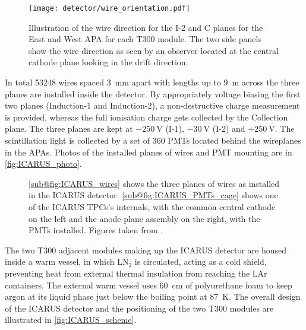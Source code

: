 \begin{figure}
    \centering
    \texttt{[image: detector/wire\_orientation.pdf]}
    \caption[T300 module Induction-2 and collection planes wire orientation]{Illustration of the wire direction for the I-2 and C planes for the East and West APA for each T300 module. The two side panels show the wire direction as seen by an observer located at the central cathode plane looking in the drift direction. }
    \label{fig:i2_c_planes_wirepitch_detail}
\end{figure}

In total \num{53248} wires spaced \SI{3}{\mm} apart with lengths up to \SI{9}{\m} across the three planes are installed inside the detector. By appropriately voltage biasing the first two planes (Induction-1 and Induction-2), a non-destructive charge measurement is provided, whereas the full ionisation charge gets collected by the Collection plane. The three planes are kept at $-\SI{250}{\volt}$ (I-1), $-\SI{30}{\volt}$ (I-2) and $+\SI{250}{\volt}$. The scintillation light is collected by a set of \num{360} PMTs located behind the wireplanes in the APAs. Photos of the installed planes of wires and PMT mounting are in \autoref{fig:ICARUS_photo}. 

\begin{figure}
    \centering
    \hspace{1em}
    \caption[ICARUS TPC wires and field cage]{\ref{sub@fig:ICARUS_wires} shows the three planes of wires as installed in the ICARUS detector. \ref{sub@fig:ICARUS_PMTs_cage} shows one of the ICARUS TPCs's internals, with the common central cathode on the left and the anode plane assembly on the right, with the PMTs installed. Figures taken from \cite{amerioDesignConstructionTests2004c,abratenkoICARUSFermilabShortBaseline2023}. }
    \label{fig:ICARUS_photo} 
\end{figure}

The two T300 adjacent modules making up the ICARUS detector are housed inside a warm vessel, in which LN$_2$ is circulated, acting as a cold shield, preventing heat from external thermal insulation from reaching the LAr containers. The external warm vessel uses \SI{60}{\cm} of polyurethane foam to keep argon at its liquid phase just below the boiling point at \SI{87}{\kelvin}. The overall design of the ICARUS detector and the positioning of the two T300 modules are illustrated in \autoref{fig:ICARUS_scheme}. 

